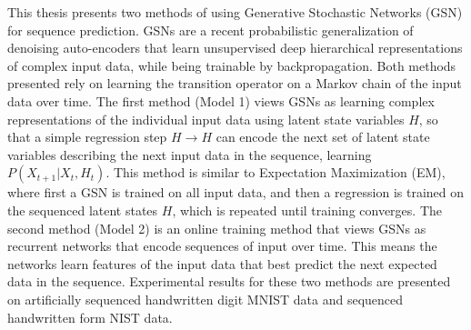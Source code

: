 This thesis presents two methods of using Generative Stochastic Networks (GSN) for sequence prediction. GSNs are a recent probabilistic generalization of denoising auto-encoders that learn unsupervised deep hierarchical representations of complex input data, while being trainable by backpropagation. Both methods presented rely on learning the transition operator on a Markov chain of the input data over time. The first method (Model 1) views GSNs as learning complex representations of the individual input data using latent state variables \(H\), so that a simple regression step \(H \rightarrow H\) can encode the next set of latent state variables describing the next input data in the sequence, learning \(P(X_{t+1}|X_t, H_t)\). This method is similar to Expectation Maximization (EM), where first a GSN is trained on all input data, and then a regression is trained on the sequenced latent states \(H\), which is repeated until training converges. The second method (Model 2) is an online training method that views GSNs as recurrent networks that encode sequences of input over time. This means the networks learn features of the input data that best predict the next expected data in the sequence. Experimental results for these two methods are presented on artificially sequenced handwritten digit MNIST data and sequenced handwritten form NIST data.